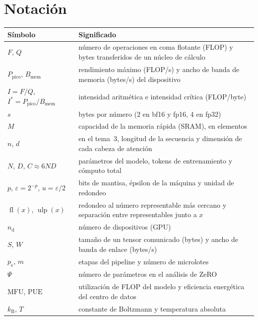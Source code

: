 \documentclass[11pt,a4paper,twoside,openany]{book}
\newcommand{\Ppico}{P_{\mathrm{pico}}}
\newcommand{\Bmem}{B_{\mathrm{mem}}}
\newcommand{\Icrit}{I^{\ast}}
\newcommand{\fl}{\operatorname{fl}}
\newcommand{\ulp}{\operatorname{ulp}}
\newcommand{\MFU}{\mathrm{MFU}}
\newcommand{\PUE}{\mathrm{PUE}}
\newcommand{\kB}{k_{\mathrm{B}}}
\begin{document}
\section*{Notación}
\begin{center}\small
\begin{tabularx}{\textwidth}{@{}l>{\raggedright\arraybackslash}X@{}}
\toprule
Símbolo & Significado \\
\midrule
$F$, $Q$ & número de operaciones en coma flotante (FLOP) y bytes transferidos de un núcleo de cálculo \\
$\Ppico$, $\Bmem$ & rendimiento máximo (FLOP/s) y ancho de banda de memoria (bytes/s) del dispositivo \\
$I=F/Q$, $\Icrit=\Ppico/\Bmem$ & intensidad aritmética e intensidad crítica (FLOP/byte) \\
$s$ & bytes por número (2 en bf16 y fp16, 4 en fp32) \\
$M$ & capacidad de la memoria rápida (SRAM), en elementos \\
$n$, $d$ & en el tema~3, longitud de la secuencia y dimensión de cada cabeza de atención \\
$N$, $D$, $C\approx 6ND$ & parámetros del modelo, tokens de entrenamiento y cómputo total \\
$p$, $\varepsilon=2^{-p}$, $u=\varepsilon/2$ & bits de mantisa, épsilon de la máquina y unidad de redondeo \\
$\fl(x)$, $\ulp(x)$ & redondeo al número representable más cercano y separación entre representables junto a $x$ \\
$n_{\mathrm{d}}$ & número de dispositivos (GPU) \\
$S$, $W$ & tamaño de un tensor comunicado (bytes) y ancho de banda de enlace (bytes/s) \\
$p_{\mathrm{e}}$, $m$ & etapas del pipeline y número de microlotes \\
$\Psi$ & número de parámetros en el análisis de ZeRO \\
$\MFU$, $\PUE$ & utilización de FLOP del modelo y eficiencia energética del centro de datos \\
$\kB$, $T$ & constante de Boltzmann y temperatura absoluta \\
\bottomrule
\end{tabularx}
\end{center}

\tableofcontents

\mainmatter







\appendix


\backmatter

\end{document}
